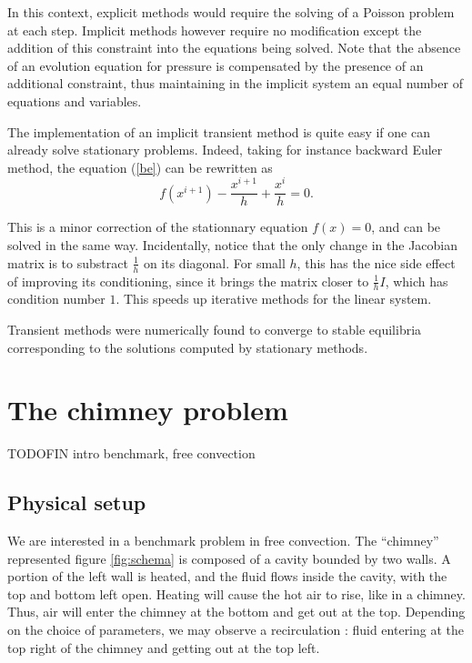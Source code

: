 \documentclass[12pt]{article}
\begin{document}
In this context, explicit methods would require the solving of a
Poisson problem at each step. Implicit methods however require no
modification except the addition of this constraint into the equations
being solved. Note that the absence of an evolution equation for
pressure is compensated by the presence of an additional constraint,
thus maintaining in the implicit system an equal number of equations
and variables.

The implementation of an implicit transient method is quite easy if
one can already solve stationary problems. Indeed, taking for instance
backward Euler method, the equation (\ref{be}) can be rewritten
as
$$f(x^{i+1}) - \frac{x^{i+1}}{h} + \frac{x^i}{h} = 0.$$

This is a minor correction of the stationnary equation $f(x) = 0$, and
can be solved in the same way. Incidentally, notice that the only
change in the Jacobian matrix is to substract $\frac{1}{h}$ on its
diagonal. For small $h$, this has the nice side effect of improving
its conditioning, since it brings the matrix closer to $\frac{1}{h}
I$, which has condition number $1$. This speeds up iterative methods
for the linear system.

Transient methods were numerically found to converge to stable
equilibria corresponding to the solutions computed by stationary
methods.
\section{The chimney problem}
TODOFIN intro benchmark, free convection
\subsection{Physical setup}
We are interested in a benchmark problem in free convection. The
``chimney'' represented figure \ref{fig:schema} is composed of a
cavity bounded by two walls. A portion of the left wall is heated, and
the fluid flows inside the cavity, with the top and bottom left
open. Heating will cause the hot air to rise, like in a chimney. Thus,
air will enter the chimney at the bottom and get out at the
top. Depending on the choice of parameters, we may observe a
recirculation : fluid entering at the top right of the chimney and
getting out at the top left.
\end{document}
